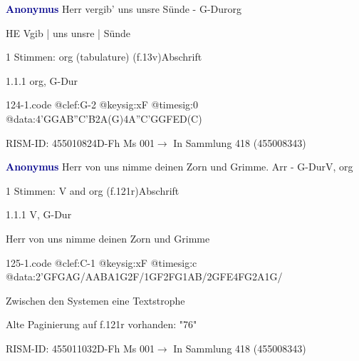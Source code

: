 \documentclass[twocolumn]{book}
\begin{document}
\par \vspace{7pt} \textcolor{darkblue}{\textbf{Anonymus  }}\hfillplus{\textbf{[124]}}\newline Herr vergib' uns unsre Sünde - G-Dur\newline org
\par \begin{itshape}[f.13v, at left:] HE Vgib | uns unsre | Sünde\end{itshape} 
\par \textcolor{darkblue}{}  1 Stimmen: org (tabulature)  (f.13v)\newline Abschrift
\par 1.1.1  org, G-Dur  
\begin{filecontents*}{124-1.code}
@clef:G-2
@keysig:xF
@timesig:0
@data:4'GGAB''C'B2A(G)4A''C'GGFED(C)
\end{filecontents*}
\newline
%
\par RISM-ID: 455010824\newline D-Fh  Ms 001\newline $\rightarrow$ In Sammlung 418 (455008343)
      
\par \vspace{7pt} \textcolor{darkblue}{\textbf{Anonymus  }}\hfillplus{\textbf{[125]}}\newline Herr von uns nimme deinen Zorn und Grimme. Arr - G-Dur\newline V, org
\par \begin{itshape}\end{itshape} 
\par \textcolor{darkblue}{}  1 Stimmen: V and org  (f.121r)\newline Abschrift
\par 1.1.1  V, G-Dur\newline \begin{footnotesize} Herr von uns nimme deinen Zorn und Grimme \end{footnotesize}  
\begin{filecontents*}{125-1.code}
@clef:C-1
@keysig:xF
@timesig:c
@data:2'GFGAG/AABA1G2F/1GF2FG1AB/2GFE4FG2A1G/
\end{filecontents*}
\newline
%
\par Zwischen den Systemen eine Textstrophe
\par Alte Paginierung auf f.121r vorhanden: "76"
\par RISM-ID: 455011032\newline D-Fh  Ms 001\newline $\rightarrow$ In Sammlung 418 (455008343)
      
\end{document}
